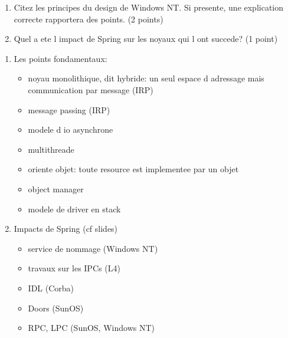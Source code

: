 \begin{enumerate}
  \item
	Citez les principes du design de Windows NT. Si presente, une explication
	correcte rapportera des points. (2 points)
  \item
	Quel a ete l impact de Spring sur les noyaux qui l ont succede? (1 point)
\end{enumerate}

\begin{correction}

\begin{enumerate}
  \item
	Les points fondamentaux:
	\begin{itemize}
	  \item noyau monolithique, dit hybride: un seul espace d adressage mais
	  communication par message (IRP)
	  \item message passing (IRP)
          \item modele d io asynchrone
	  \item multithreade
	  \item oriente objet: toute resource est implementee par un objet
	  \item object manager
	  \item modele de driver en stack
	\end{itemize}
  \item
	Impacts de Spring (cf slides)
	\begin{itemize}
	  \item service de nommage (Windows NT)
	  \item travaux sur les IPCs (L4)
	  \item IDL (Corba)
	  \item Doors (SunOS)
	  \item RPC, LPC (SunOS, Windows NT)
	\end{itemize}
\end{enumerate}

\end{correction}


